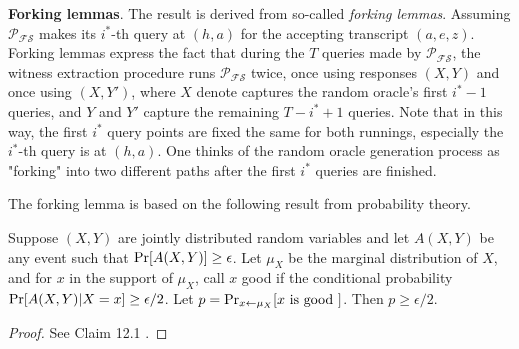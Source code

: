 \documentclass{article}
\begin{document}
\textbf{Forking lemmas}. The result is derived from so-called \textit{forking lemmas}. Assuming $\mathcal{P_{FS}}$ makes its $i^{\displaystyle *}$-th query at $(h, a)$ for the accepting transcript $(a, e, z)$. Forking lemmas express the fact that during the $T$ queries made by $\mathcal{P_{FS}}$, the witness extraction procedure runs $\mathcal{P_{FS}}$ twice, once using responses $(X, Y)$ and once using $(X, Y')$, where $X$ denote captures the random oracle's first $i^{\displaystyle *} - 1$ queries, and $Y$ and $Y'$ capture the remaining $T - i^{\displaystyle *} + 1$ queries. Note that in this way, the first $i^{\displaystyle *}$ query points are fixed the same for both runnings, especially the $i^{\displaystyle *}$-th query is at $(h, a)$. One thinks of the random oracle generation process as "forking" into two different paths after the first $i^{\displaystyle *}$ queries are finished. 

The forking lemma is based on the following result from probability theory.

\begin{boxx2}
Suppose $(X, Y)$ are jointly distributed random variables and let $A(X, Y)$ be any event such that $\operatorname{Pr}[A(X, Y)] \geq \epsilon$. Let $\mu_X$ be the marginal distribution of $X$, and for $x$ in the support of $\mu_X$, call $x$ good if the conditional probability $\operatorname{Pr}[A(X, Y) \vert X = x] \geq \epsilon/2$. Let $p = \operatorname{Pr}_{x \leftarrow \mu_X} [x \text{ is good }]$. Then $p \geq \epsilon/2$. \end{boxx2}

\begin{proof}
See Claim 12.1 \cite{ThalerBookZKP}.
\end{proof}
\end{document}

